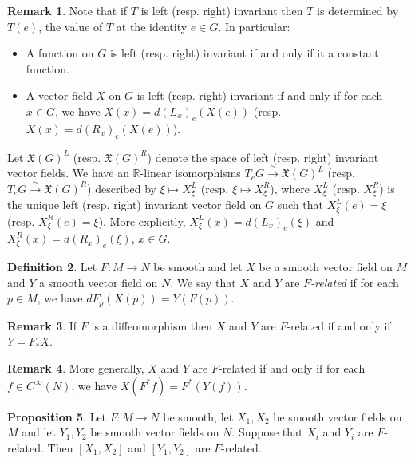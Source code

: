 \documentclass{amsart}
\numberwithin{equation}{section}
\newcommand{\bR}{\mathbb{R}}
\theoremstyle{definition}
\newtheorem{definition}{Definition} [section]
\newtheorem{remark}[definition]{Remark}
\theoremstyle{theorem}
\newtheorem{proposition}[definition]{Proposition}
\begin{document}
\begin{remark}
Note that if $T$ is left (resp. right) invariant then $T$ is determined by 
$T(e)$, the value of $T$ at the identity $e\in G$.  In particular:
\begin{itemize}
\item A function on $G$ is left (resp. right) invariant 
if and only if it a constant function.
\item A vector field $X$ on $G$ is left (resp. right) invariant if and only if for each $x\in G$, we have
$X(x)=d(L_x)_e(X(e))$ (resp. $X(x)=d(R_x)_e(X(e))$).
\end{itemize}
\end{remark}



Let $\mathfrak{X}(G)^L$ (resp. $\mathfrak{X}(G)^R$) denote the space of left (resp. right) invariant vector fields. 
We have an $\bR$-linear isomorphisms $T_eG \stackrel{\simeq}{\longrightarrow} \mathfrak{X}(G)^L$ 
(resp. $T_eG \stackrel{\simeq}{\longrightarrow} \mathfrak{X}(G)^R$) described by 
$\xi \mapsto X_\xi^L$ (resp. $\xi\mapsto X_\xi^R$),
where $X_\xi^L$ (resp. $X_\xi^R$) is the unique left (resp. right) invariant vector field on 
$G$ such that $X_\xi^L(e)=\xi$ (resp. $X_\xi^R(e)=\xi$). More explicitly,
$X_\xi^L(x)=d(L_x)_e(\xi)$ and $X_\xi^R(x)=d(R_x)_e(\xi)$, $x\in G$. 


\begin{definition}
Let $F : M \to N$ be smooth and let $X$ be a smooth vector field on $M$ and $Y$ a smooth vector field on $N$. We say that $X$ and $Y$ are 
{\em $F$-related} if for each $p \in M$, we have $dF_p(X(p)) = Y(F(p))$. 
\end{definition}

\begin{remark}
If $F$ is a diffeomorphism then $X$ and $Y$ are $F$-related if and only if $Y = F_*X$. 
\end{remark}

\begin{remark}\label{F-related}
More generally, $X$ and $Y$ are $F$-related if and only if for each $f \in C^\infty(N)$, we have $X(F^*f) = F^*(Y(f))$. 
\end{remark}

\begin{proposition}
Let $F : M \to N$ be smooth, let $X_1, X_2$ be smooth vector fields on $M$ and let $Y_1, Y_2$ be smooth vector fields on $N$. Suppose that $X_i$ and $Y_i$ are $F$-related. Then $[X_1, X_2]$ and $[Y_1, Y_2]$ are $F$-related. 
\end{proposition}
\end{document}
